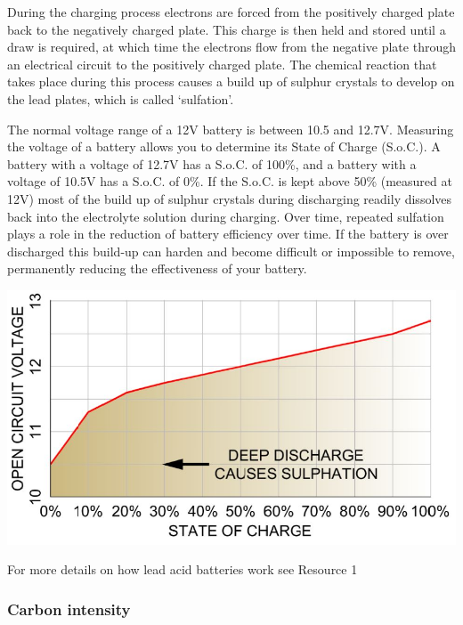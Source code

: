\documentclass{article}
\theoremstyle{definition}
\theoremstyle{definition}
\theoremstyle{remark}
\begin{document}
      During the charging process electrons are forced from the positively charged plate back to the negatively charged plate. This charge is then held and stored until a draw is required, at which time the electrons flow from the negative plate through an electrical circuit to the positively charged plate. The chemical reaction that takes place during this process causes a build up of sulphur crystals to develop on the lead plates, which is called ‘sulfation’. 

      The normal voltage range of a 12V battery is between 10.5 and 12.7V. Measuring the voltage of a battery allows you to determine its State of Charge (S.o.C.). A battery with a voltage of 12.7V has a S.o.C. of 100\%, and a battery with a voltage of 10.5V has a S.o.C. of 0\%. If the S.o.C. is kept above 50\% (measured at 12V) most of the build up of sulphur crystals during discharging readily dissolves back into the electrolyte solution during charging. Over time, repeated sulfation plays a role in the reduction of battery efficiency over time. If the battery is over discharged this build-up can harden and become difficult or impossible to remove, permanently reducing the effectiveness of your battery. 

      \begin{center}
        \includegraphics[width=0.65\paperwidth]{Images/image_5_1_(sulphation).png}
      \end{center}

      For more details on how lead acid batteries work see Resource 1
    

    \subsubsection{Carbon intensity} %
    \label{ssub:carbon_intensity}
\end{document}

